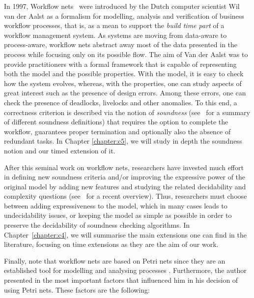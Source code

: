 In 1997, Workflow nets~\cite{Aalst97,Aalst98} were introduced 
by the Dutch computer scientist Wil van der Aalst as a formalism
for modelling, analysis and verification of business workflow processes, that is, as a mean to support
the \emph{build time part} of a workflow management system.
As systems are moving from data-aware to process-aware, workflow nets abstract away most of the data  presented in the process
while focusing only on its possible flow. The aim of Van der Aalst was to provide practitioners with 
a formal framework that is capable of representing both the model and the possible properties. With the model, 
it is easy to check how the system evolves, whereas, with the properties, one can study aspects of great interest such as 
the presence of design errors. Among these errors, one can check the presence of deadlocks, livelocks 
and other anomalies. To this end, a correctness criterion is described
via the notion of \emph{soundness} (see~\cite{AalstHHSVVW11} for a summary of different soundness definitions) that
requires the option to complete the workflow, guarantees proper termination
and optionally also the absence of redundant tasks. In Chapter \ref{chapter:c5}, we will study in depth the soundness notion and
our timed extension of it. 

After this seminal work on workflow nets, researchers have 
invested much effort in defining new soundness criteria and/or 
improving the expressive power of the original model by adding new features 
and studying the related decidability and 
complexity questions
(see~\cite{AalstHHSVVW11} for a recent overview). Thus, researchers must choose between 
adding expressiveness to the model, which in many cases leads to undecidability issues, or keeping the model as simple as possible
in order to preserve the decidability of soundness checking algorithms. In Chapter~\ref{chapter:c4}, we will summarise the main extensions one can find in the literature, focusing
on time extensions as they are the aim of our work.

Finally, note that workflow nets are based on Petri nets since they are an established tool 
for modelling and analysing processes \cite{Aalst97}. Furthermore, the author presented in \cite{Aalst97} the most important factors
that influenced him in his decision of using Petri nets. These factors are the following:


